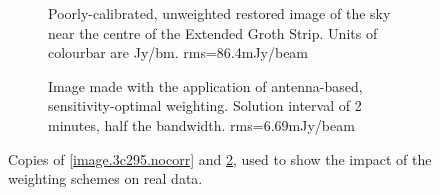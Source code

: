 \begin{figure}[h!]
\begin{subfigure}{.49\textwidth}
\caption{\label{image.3c295.nocorr1} Poorly-calibrated, unweighted restored image of the sky near the centre of the Extended Groth Strip. {Units of colourbar are Jy/bm}. rms=86.4mJy/beam}
\end{subfigure}
\begin{subfigure}{.49\textwidth}
\caption{\label{image.3c295.antcorr1} Image made with the application of antenna-based, sensitivity-optimal weighting. Solution interval of 2 minutes, half the bandwidth. rms=6.69mJy/beam}
\end{subfigure}
\caption{\label{stuff} Copies of \cref{image.3c295.nocorr} and \cref{image.3c295.antcorr1}, used to show the impact of the weighting schemes on real data.}
\end{figure}

